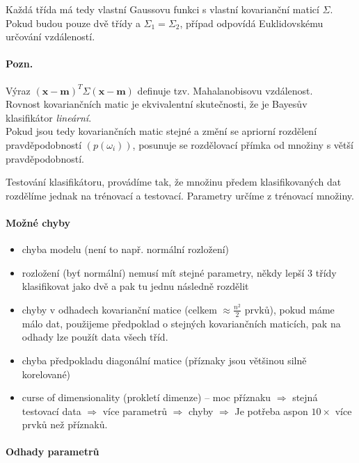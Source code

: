 Každá třída má tedy vlastní Gaussovu funkci s vlastní kovarianční maticí $\Sigma$.
Pokud budou pouze dvě třídy a $\Sigma_1=\Sigma_2$, případ odpovídá Euklidovskému určování vzdáleností.

\paragraph{Pozn.} Výraz $(\bm x-\bm m)^T\Sigma(\bm x-\bm m)$ definuje tzv. Mahalanobisovu vzdálenost.\\
Rovnost kovariančních matic je ekvivalentní skutečnosti, že je Bayesův klasifikátor \emph{lineární}.\\
Pokud jsou tedy kovariančních matic stejné a změní se apriorní rozdělení 
pravděpodobností $(p(\omega_i))$, posunuje se rozdělovací přímka od množiny s větší pravděpodobností.


Testování klasifikátoru, provádíme tak, že množinu předem klasifikovaných dat rozdělíme jednak na trénovací a
testovací. Parametry určíme z trénovací množiny.

\paragraph{Možné chyby}
\begin{itemize}
	\item chyba modelu (není to např. normální rozložení)
	\item rozložení (byť normální) nemusí mít stejné parametry, někdy lepší 3 třídy klasifikovat jako dvě a pak tu
	jednu následně rozdělit
	\item chyby v odhadech kovarianční matice (celkem $\approx\frac{n^2}{2}$ prvků), pokud máme málo dat, 
	použijeme předpoklad o stejných kovariančních maticích, pak na odhady lze použít data všech tříd.
	\item chyba předpokladu diagonální matice (příznaky jsou většinou silně korelované)
	\item curse of dimensionality (prokletí dimenze) -- moc příznaku $\Rightarrow$ stejná testovací data $\Rightarrow$ 
	více parametrů $\Rightarrow$ chyby $\Rightarrow$ Je potřeba aspon $10\times$ více prvků než příznaků.
\end{itemize}

\paragraph{Odhady parametrů}


